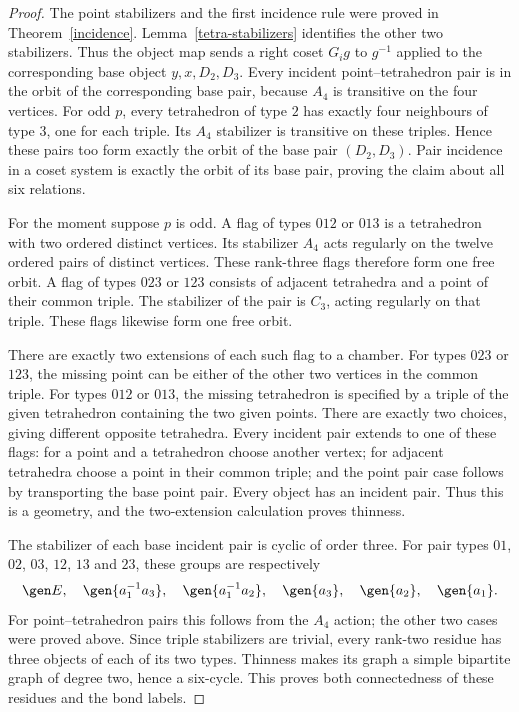 \begin{proof}
The point stabilizers and the first incidence rule were proved in
Theorem~\ref{incidence}. Lemma~\ref{tetra-stabilizers} identifies
the other two stabilizers. Thus the object map sends a right coset
$G_i g$ to $g^{-1}$ applied to the corresponding base object
$y,x,D_2,D_3$. Every incident point--tetrahedron pair is in the
orbit of the corresponding base pair, because $A_4$ is transitive
on the four vertices. For odd $p$, every tetrahedron of type $2$
has exactly four neighbours of type $3$, one for each triple.
Its $A_4$ stabilizer is transitive on these triples. Hence these
pairs too form exactly the orbit of the base pair $(D_2,D_3)$.
Pair incidence in a coset system is exactly the orbit of its base
pair, proving the claim about all six relations.

For the moment suppose $p$ is odd. A flag of types $012$ or $013$
is a tetrahedron with two ordered distinct vertices. Its stabilizer
$A_4$ acts regularly on the twelve ordered pairs of distinct
vertices. These rank-three flags therefore form one free orbit.
A flag of types $023$ or $123$ consists of adjacent tetrahedra
and a point of their common triple. The stabilizer of the pair is
$C_3$, acting regularly on that triple. These flags likewise form
one free orbit.

There are exactly two extensions of each such flag to a chamber.
For types $023$ or $123$, the missing point can be either of the
other two vertices in the common triple. For types $012$ or
$013$, the missing tetrahedron is specified by a triple of the
given tetrahedron containing the two given points. There are
exactly two choices, giving different opposite tetrahedra.
Every incident pair extends to one of these flags: for a point
and a tetrahedron choose another vertex; for adjacent tetrahedra
choose a point in their common triple; and the point pair case
follows by transporting the base point pair. Every object has
an incident pair. Thus this is a geometry, and the two-extension
calculation proves thinness.

The stabilizer of each base incident pair is cyclic of order
three. For pair types $01$, $02$, $03$, $12$, $13$ and $23$,
these groups are respectively
\[
 \gen E,\quad\gen{a_1^{-1}a_3},\quad\gen{a_1^{-1}a_2},\quad
 \gen{a_3},\quad\gen{a_2},\quad\gen{a_1}.
\]
For point--tetrahedron pairs this follows from the $A_4$ action;
the other two cases were proved above. Since triple stabilizers
are trivial, every rank-two residue has three objects of each
of its two types. Thinness makes its graph a simple bipartite
graph of degree two, hence a six-cycle. This proves both
connectedness of these residues and the bond labels.


\end{proof}
